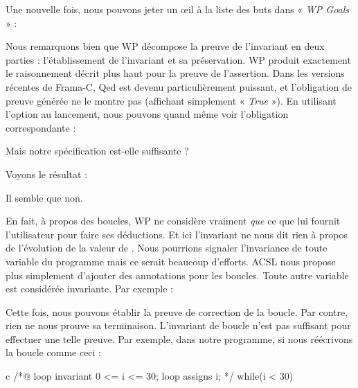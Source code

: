 Une nouvelle fois, nous pouvons jeter un œil à la liste des buts dans « \textit{WP
Goals} » :





Nous remarquons bien que WP décompose la preuve de l'invariant en deux parties :
l'établissement de l'invariant et sa préservation. WP produit exactement le
raisonnement décrit plus haut pour la preuve de l'assertion. Dans les versions
récentes de Frama-C, Qed est devenu particulièrement puissant, et l'obligation de
preuve générée ne le montre pas (affichant simplement « \textit{True} »). En utilisant
l'option  au lancement, nous pouvons quand même voir
l'obligation correspondante :





Mais notre spécification est-elle suffisante ?






Voyons le résultat :





Il semble que non.





En fait, à propos des boucles, WP ne considère vraiment \textit{que} ce que lui
fournit l'utilisateur pour faire ses déductions. Et ici l'invariant ne nous dit
rien à propos de l'évolution de la valeur de . Nous pourrions signaler
l'invariance de toute variable du programme mais ce serait beaucoup d'efforts.
ACSL nous propose plus simplement d'ajouter des annotations  pour
les boucles. Toute autre variable est considérée invariante. Par exemple :





Cette fois, nous pouvons établir la preuve de correction de la boucle. Par contre,
rien ne nous prouve sa terminaison. L'invariant de boucle n'est pas suffisant pour
effectuer une telle preuve. Par exemple, dans notre programme, si nous réécrivons
la boucle comme ceci :



\begin{CodeBlock}{c}
/*@
  loop invariant 0 <= i <= 30;
  loop assigns i;
*/
while(i < 30){

}
\end{CodeBlock}



